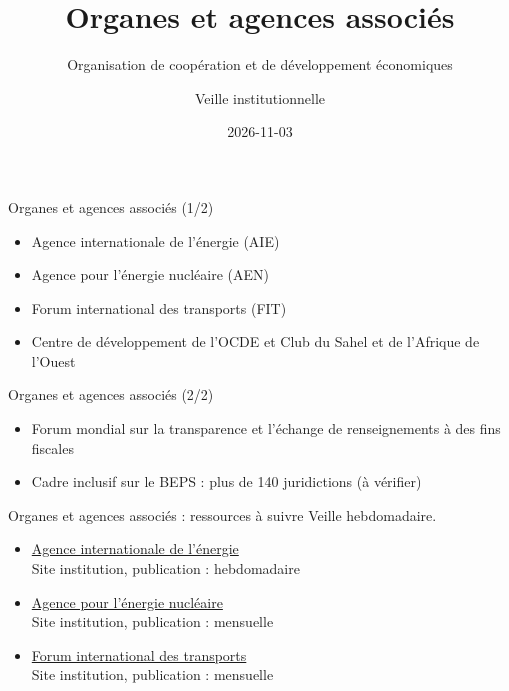 \documentclass[aspectratio=169,11pt]{beamer}
\title{Organes et agences associés}
\subtitle{Organisation de coopération et de développement économiques}
\author{Veille institutionnelle}
\date{2026-11-03}
\begin{document}
\begin{frame}\titlepage\end{frame}

\begin{frame}{Organes et agences associés (1/2)}
\begin{itemize}
\item Agence internationale de l'énergie (AIE)
\item Agence pour l'énergie nucléaire (AEN)
\item Forum international des transports (FIT)
\item Centre de développement de l'OCDE et Club du Sahel et de l'Afrique de l'Ouest
\end{itemize}
\end{frame}

\begin{frame}{Organes et agences associés (2/2)}
\begin{itemize}
\item Forum mondial sur la transparence et l'échange de renseignements à des fins fiscales
\item Cadre inclusif sur le BEPS : plus de 140 juridictions (à vérifier)
\end{itemize}
\end{frame}

\begin{frame}{Organes et agences associés : ressources à suivre}
\small
Veille hebdomadaire.
\begin{itemize}
\item \href{https://www.iea.org}{Agence internationale de l'énergie}\\{\footnotesize Site institution, publication : hebdomadaire}
\item \href{https://www.oecd-nea.org}{Agence pour l'énergie nucléaire}\\{\footnotesize Site institution, publication : mensuelle}
\item \href{https://www.itf-oecd.org}{Forum international des transports}\\{\footnotesize Site institution, publication : mensuelle}
\end{itemize}
\end{frame}
\end{document}
